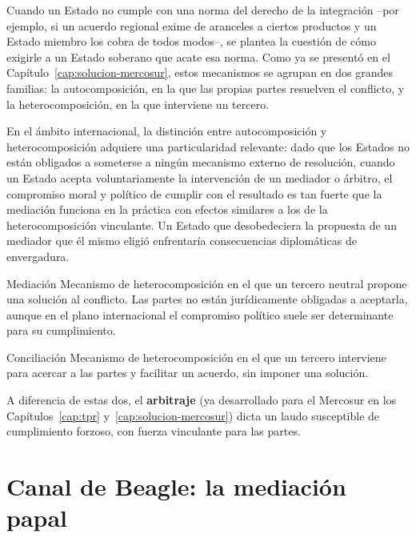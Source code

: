\documentclass[12pt,oneside]{book}
\begin{document}
Cuando un Estado no cumple con una norma del derecho de la integración --por ejemplo, si un acuerdo regional exime de aranceles a ciertos productos y un Estado miembro los cobra de todos modos--, se plantea la cuestión de cómo exigirle a un Estado soberano que acate esa norma. Como ya se presentó en el Capítulo~\ref{cap:solucion-mercosur}, estos mecanismos se agrupan en dos grandes familias: la autocomposición, en la que las propias partes resuelven el conflicto, y la heterocomposición, en la que interviene un tercero.

\begin{importante}
En el ámbito internacional, la distinción entre autocomposición y heterocomposición adquiere una particularidad relevante: dado que los Estados no están obligados a someterse a ningún mecanismo externo de resolución, cuando un Estado acepta voluntariamente la intervención de un mediador o árbitro, el compromiso moral y político de cumplir con el resultado es tan fuerte que la mediación funciona en la práctica con efectos similares a los de la heterocomposición vinculante. Un Estado que desobedeciera la propuesta de un mediador que él mismo eligió enfrentaría consecuencias diplomáticas de envergadura.
\end{importante}

\begin{definicion}{Mediación}
Mecanismo de heterocomposición en el que un tercero neutral propone una solución al conflicto. Las partes no están jurídicamente obligadas a aceptarla, aunque en el plano internacional el compromiso político suele ser determinante para su cumplimiento.
\end{definicion}

\begin{definicion}{Conciliación}
Mecanismo de heterocomposición en el que un tercero interviene para acercar a las partes y facilitar un acuerdo, sin imponer una solución.
\end{definicion}

A diferencia de estas dos, el \textbf{arbitraje} (ya desarrollado para el Mercosur en los Capítulos~\ref{cap:tpr} y~\ref{cap:solucion-mercosur}) dicta un laudo susceptible de cumplimiento forzoso, con fuerza vinculante para las partes.

\section{Canal de Beagle: la mediación papal}
\end{document}
